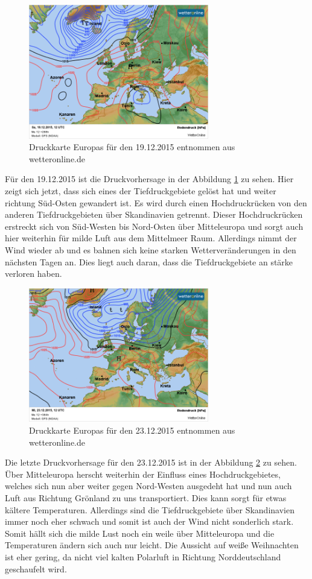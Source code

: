 \documentclass[12pt,a4paper,titlepage,headinclude]{scrartcl}
\numberwithin{equation}{subsection}
\begin{document}
\begin{figure}[!h]
\centering
\includegraphics[width=0.7\textwidth]{wetter1912.png}
\caption{Druckkarte Europas für den 19.12.2015 entnommen aus wetteronline.de}
\label{fig:w1912}
\end{figure}
Für den 19.12.2015 ist die Druckvorhersage in der Abbildung \ref{fig:w1912} zu sehen.
Hier zeigt sich jetzt, dass sich eines der Tiefdruckgebiete gelöst hat und weiter richtung Süd-Osten gewandert ist.
Es wird durch einen Hochdruckrücken von den anderen Tiefdruckgebieten über Skandinavien getrennt.
Dieser Hochdruckrücken erstreckt sich von Süd-Westen bis Nord-Osten über Mitteleuropa und sorgt auch hier weiterhin für milde Luft aus dem Mittelmeer Raum.
Allerdings nimmt der Wind wieder ab und es bahnen sich keine starken Wetterveränderungen in den nächsten Tagen an.
Dies liegt auch daran, dass die Tiefdruckgebiete an stärke verloren haben.

\begin{figure}[!h]
\centering
\includegraphics[width=0.7\textwidth]{wetter2312.png}
\caption{Druckkarte Europas für den 23.12.2015 entnommen aus wetteronline.de}
\label{fig:w2312}
\end{figure}
Die letzte Druckvorhersage für den 23.12.2015 ist in der Abbildung \ref{fig:w2312} zu sehen.
Über Mitteleuropa herscht weiterhin der Einfluss eines Hochdruckgebietes, welches sich nun aber weiter gegen Nord-Westen ausgedeht hat und nun auch Luft aus Richtung Grönland zu uns transportiert.
Dies kann sorgt für etwas kältere Temperaturen.
Allerdings sind die Tiefdruckgebiete über Skandinavien immer noch eher schwach und somit ist auch der Wind nicht sonderlich stark.
Somit hällt sich die milde Lust noch ein weile über Mitteleuropa und die Temperaturen ändern sich auch nur leicht.
Die Aussicht auf weiße Weihnachten ist eher gering, da nicht viel kalten Polarluft in Richtung Norddeutschland geschaufelt wird.
\end{document}
